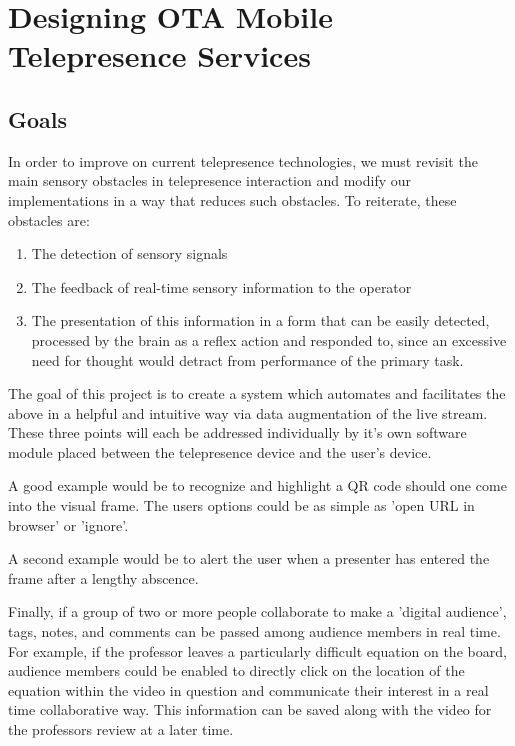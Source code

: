 \documentclass[a4paper,12pt]{report}
\begin{document}
\chapter{Designing OTA Mobile Telepresence Services}
\section{Goals}

In order to improve on current telepresence technologies, we must revisit the main sensory obstacles in telepresence interaction and modify our implementations in a way that reduces such obstacles. To reiterate, these obstacles are:
	\begin{enumerate}
		\item The detection of sensory signals
		\item The feedback of real-time sensory information to the operator
		\item The presentation of this information in a form that can be easily detected, processed by the brain as a reflex action and responded to, since an excessive need for thought would detract from performance of the primary task.
	\end{enumerate}
	\begin{flushright}
		\cite{540147}
	\end{flushright}

The goal of this project is to create a system which automates and facilitates the above in a helpful and intuitive way via data augmentation of the live stream. These three points will each be addressed individually by it's own software module placed between the telepresence device and the user's device.

A good example would be to recognize and highlight a QR code should one come into the visual frame. The users options could be as simple as 'open URL in browser' or 'ignore'.

A second example would be to alert the user when a presenter has entered the frame after a lengthy abscence.

Finally, if a group of two or more people collaborate to make a 'digital audience', tags, notes, and comments can be passed among audience members in real time. For example, if the professor leaves a particularly difficult equation on the board, audience members could be enabled to directly click on the location of the equation within the video in question and communicate their interest in a real time collaborative way. This information can be saved along with the video for the professors review at a later time.
\end{document}
